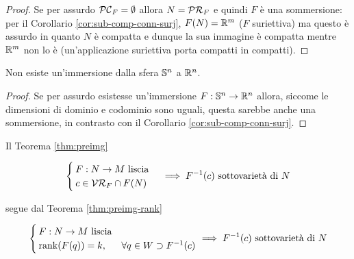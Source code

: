 \begin{proof}
	Se per assurdo $ \PC_{F} = \emptyset $ allora $ N = \PR_{F} $ e quindi $ F $ è una sommersione: per il Corollario \ref{cor:sub-comp-conn-surj}, $ F(N) = \R^{m} $ ($ F $ suriettiva) ma questo è assurdo in quanto $ N $ è compatta e dunque la sua immagine è compatta mentre $ \R^{m} $ non lo è (un'applicazione suriettiva porta compatti in compatti).
\end{proof}

\begin{corollary}\label{imm_sph}
	Non esiste un'immersione dalla sfera $ \S^{n} $ a $ \R^{n} $.
\end{corollary}

\begin{proof}
	Se per assurdo esistesse un'immersione $ F : \S^{n} \to \R^{n} $ allora, siccome le dimensioni di dominio e codominio sono uguali, questa sarebbe anche una sommersione, in contrasto con il Corollario \ref{cor:sub-comp-conn-surj}.
\end{proof}

\begin{remark}
	Il Teorema \ref{thm:preimg}

	\begin{equation}
		\begin{cases}
			F : N \to M \text{ liscia} \\
			c \in \VR_{F} \cap F(N)
		\end{cases} %
		\implies %
		F^{-1}(c) \text{ sottovarietà di } N
	\end{equation}

	segue dal Teorema \ref{thm:preimg-rank}
	
	\begin{equation}
		\begin{cases}
			F : N \to M \text{ liscia} \\
			\rank(F(q)) = k, & \forall q \in W \supset F^{-1}(c)
		\end{cases} %
		\implies %
		F^{-1}(c) \text{ sottovarietà di } N
	\end{equation}
\end{remark}

